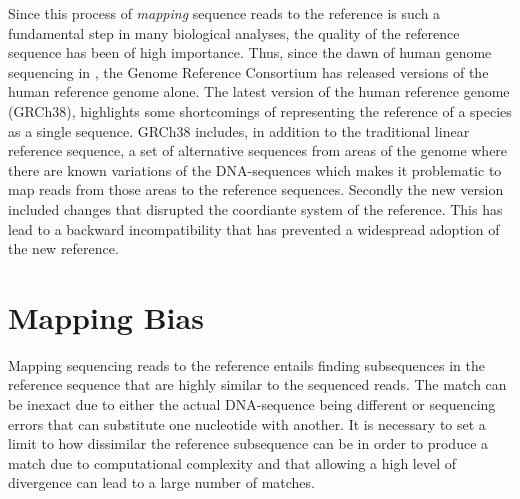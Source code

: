 Since this process of \emph{mapping} sequence reads to the reference is such a fundamental step in many biological analyses, the quality of the reference sequence has been of high importance. Thus, since the dawn of human genome sequencing in , the Genome Reference Consortium has released  versions of the human reference genome alone. The latest version of the human reference genome (GRCh38), highlights some shortcomings of representing the reference of a species as a single sequence. GRCh38 includes, in addition to the traditional linear reference sequence, a set of alternative sequences from areas of the genome where there are known variations of the DNA-sequences which makes it problematic to map reads from those areas to the reference sequences. Secondly the new version included changes that disrupted the coordiante system of the reference. This has lead to a backward incompatibility that has prevented a widespread adoption of the new reference.

\section{Mapping Bias}
Mapping sequencing reads to the reference entails finding subsequences in the reference sequence that are highly similar to the sequenced reads. The match can be inexact due to either the actual DNA-sequence being different or sequencing errors that can substitute one nucleotide with another. It is necessary to set a limit to how dissimilar the reference subsequence can be in order to produce a match due to computational complexity and that allowing a high level of divergence can lead to a large number of matches.


